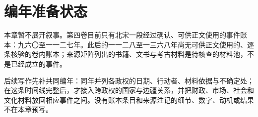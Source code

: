 \section{编年准备状态}

本章暂不展开叙事。第四卷目前只有北宋一段经过确认、可供正文使用的事件账本：九六〇至一一二七年。此后的一一二八至一三六八年尚无可供正文使用的、逐条核验的卷内账本；来源矩阵列出的书籍、文书与考古材料是待核查的材料池，不是已经成立的事件。

后续写作先补共同编年：同年并列各政权的日期、行动者、材料依据与不确定处；在这条时间线完整后，才接入跨政权的国家与边疆关系，并把财政、市场、社会和文化材料放回相应事件之间。没有账本条目和来源注记的细节、数字、动机或结果不在本章预写。
